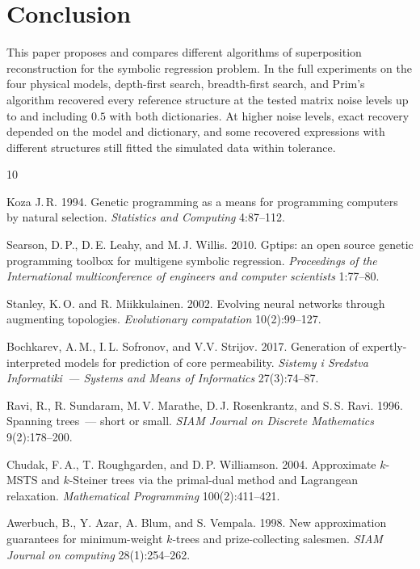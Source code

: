 \documentclass[12pt]{article}
\newif\ifhighlight \highlighttrue
\begin{document}

\clearpage
\section{Conclusion}
This paper proposes and compares different algorithms of superposition reconstruction for the symbolic regression problem. {\ifhighlight\color{blue}\fi In the full experiments on the four physical models, depth-first search, breadth-first search, and Prim's algorithm recovered every reference structure at the tested matrix noise levels up to and including $0.5$ with both dictionaries. At higher noise levels, exact recovery depended on the model and dictionary, and some recovered expressions with different structures still fitted the simulated data within tolerance.}

\begin{thebibliography}{10}

Koza J.\,R. 1994. Genetic programming as a means for programming computers by natural selection. {\em Statistics and Computing}  4:87--112.

Searson, D.\,P.,  D.\,E. Leahy, and M.\,J. Willis. 2010. Gptips: an open source genetic programming toolbox for multigene  symbolic regression. {\em Proceedings of the International multiconference of engineers and computer scientists} 1:77--80.

Stanley, K.\,O.  and R. Miikkulainen. 2002. Evolving neural networks through augmenting topologies.  {\em Evolutionary computation} 10(2):99--127.

Bochkarev, A.\,M., I.\,L. Sofronov, and V.V. Strijov. 2017. Generation of expertly-interpreted models for prediction of core
permeability. {\em Sistemy i Sredstva Informatiki~--- Systems and Means of Informatics} 27(3):74--87.

Ravi, R., R. Sundaram, M.\,V. Marathe, D.\,J. Rosenkrantz, and S.\,S. Ravi. 1996. Spanning trees~--- short or small.
{\em SIAM Journal on Discrete Mathematics} 9(2):178--200.

Chudak, F.\,A.,  T. Roughgarden, and D.\,P. Williamson. 2004. Approximate $k$-MSTS and $k$-Steiner trees via the primal-dual method and Lagrangean relaxation. {\em Mathematical Programming} 100(2):411--421.

Awerbuch, B., Y. Azar, A. Blum, and S. Vempala. 1998. New approximation guarantees for minimum-weight $k$-trees and prize-collecting salesmen. {\em SIAM Journal on computing} 28(1):254--262.


\end{thebibliography}
\end{document}
